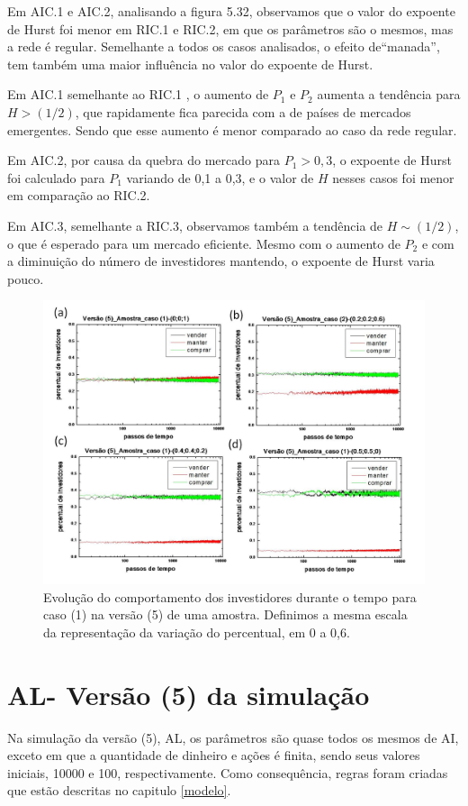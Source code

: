 \documentclass[brazil,ruledheader]{abnt}
\begin{document}
Em AIC.1 e AIC.2, analisando a figura 5.32, observamos que o valor do expoente
de Hurst foi menor em RIC.1 e RIC.2, em que os parâmetros são o mesmos, mas
a rede é regular. Semelhante a todos os casos analisados, o efeito de``manada'',
tem também uma maior influência no valor do expoente de Hurst. 

Em AIC.1 semelhante ao RIC.1 , o aumento de $P_1$ e $P_2$ aumenta a tendência
para $H>(1/2)$, que rapidamente fica
parecida com a de países de mercados emergentes. Sendo que esse aumento é menor
comparado ao
caso da rede regular. 

Em AIC.2, por causa da quebra do mercado para $P_1>0,3$, o 
expoente de Hurst foi calculado para $P_1$ variando de 0,1 a 0,3, e o valor de
$H$ nesses casos foi menor em comparação ao RIC.2.  

Em AIC.3, semelhante a RIC.3,
observamos também a tendência de $H\sim (1/2)$, o que é esperado para um mercado
eficiente. Mesmo com o aumento de $P_2$  e com a diminuição do número de
investidores mantendo, o expoente de Hurst varia pouco.

\begin{figure}[!h]
\centering
\includegraphics[width=.7\linewidth]{Figuras/33.jpg}
\caption{Evolução do comportamento dos investidores durante o tempo para caso
(1) na  versão (5) de uma amostra. Definimos a mesma escala da representação da
variação do percentual, em 0 a 0,6.  }
\label{fig:evolucao-comp-investidores9}
\end{figure}

\section{AL- Versão (5) da simulação}

Na simulação da versão (5), AL, os parâmetros são quase todos os mesmos de AI,
exceto em que a quantidade de dinheiro e ações é finita, sendo seus valores
iniciais, 10000 e 100, respectivamente. Como consequência, regras foram criadas
que estão descritas no capitulo \ref{modelo}.
\end{document}
